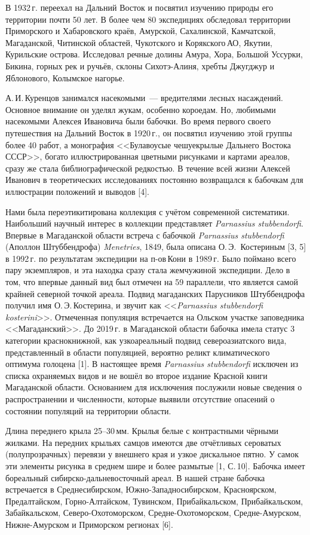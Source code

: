 В 1932\,г. переехал на Дальний Восток и посвятил изучению природы его территории почти 50 лет. В более чем 80 экспедициях обследовал территории Приморского и Хабаровского краёв, Амурской, Сахалинской, Камчатской, Магаданской, Читинской областей, Чукотского и Корякского\,АО, Якутии, Курильские острова. Исследовал речные долины Амура, Хора, Большой Уссурки, Бикина, горных рек и ручьёв, склоны Сихотэ-Алиня, хребты Джугджур и Яблонового, Колымское нагорье.

А.\,И.\,Куренцов занимался насекомыми~--- вредителями лесных насаждений. Основное внимание он уделял жукам, особенно короедам. Но, любимыми насекомыми Алексея Ивановича были бабочки. Во время первого своего путешествия на Дальний Восток в 1920\,г., он посвятил изучению этой группы более 40 работ, а монография <<Булавоусые чешуекрылые Дальнего Востока СССР>>, богато иллюстрированная цветными рисунками и картами ареалов, сразу же стала библиографической редкостью. В течение всей жизни Алексей Иванович в теоретических исследованиях постоянно возвращался к бабочкам для иллюстрации положений и выводов [4].
\enlargethispage{\baselineskip}

Нами была переэтикитирована коллекция с учётом современной систематики. Наибольший научный интерес в коллекции представляет \textit{Parnassius stubbendorfi}. Впервые в Магаданской области встреча с бабочкой \textit{Parnassius stubbendorfi} (Аполлон Штуббендрофа) \textit{Menetries}, 1849, была описана О.\,Э.~Костериным [3, 5] в 1992\,г. по результатам экспедиции на п-ов\,Кони в 1989\,г. Было поймано всего пару экземпляров, и эта находка сразу стала жемчужиной экспедиции. Дело в том, что впервые данный вид был отмечен на 59 параллели, что является самой крайней северной точкой ареала. Подвид магаданских Парусников Штуббендрофа получил имя О.\,Э.\,Костерина, и звучит как <<\textit{Parnassius stubbendorfi kosterini}>>. Отмеченная популяция встречается на Ольском участке заповедника <<Магаданский>>. До 2019\,г. в Магаданской области бабочка имела статус 3\,категории краснокнижной, как узкоареальный подвид североазиатского вида, представленный в области популяцией, вероятно реликт климатического оптимума голоцена [1]. В настоящее время \textit{Parnassius stubbendorfi} исключен из списка охраняемых видов и не вошёл во второе издание Красной книги Магаданской области. Основанием для исключения послужили новые сведения о распространении и численности, которые выявили отсутствие опасений о состоянии популяций на территории области.

Длина переднего крыла 25--30\,мм. Крылья белые с контрастными чёрными жилками. На передних крыльях самцов имеются две отчётливых сероватых (полупрозрачных) перевязи у внешнего края и узкое дискальное пятно. У самок эти элементы рисунка в среднем шире и более размытые [1, С.\,10]. Бабочка имеет бореальный сибирско-дальневосточный ареал. В нашей стране бабочка встречается в Среднесибирском, Южно-Западносибирском, Красноярском, Предалтайском, Горно-Алтайском, Тувинском, Прибайкальском, Прибайкальском, Забайкальском, Северо-Охо\-то\-морс\-ком, Средне-Охотоморском, Средне-Амурском, Нижне-Амурском и Приморском регионах [6].

